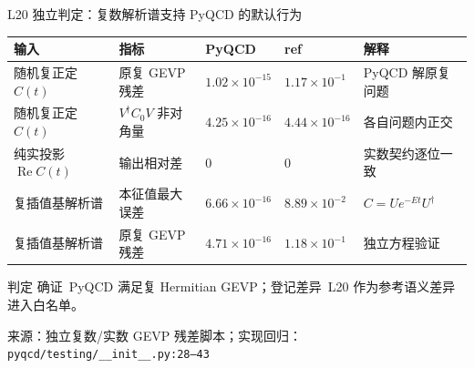 \documentclass[UTF8,aspectratio=169,11pt]{ctexbeamer}
\newcommand{\source}[1]{\vspace{0.05em}\par{\raggedright\scriptsize\color{muted}来源：#1\par}}
\newcommand{\verified}{\textcolor{evidence}{确证}}
\newcommand{\diffmark}{\textcolor{warning}{登记差异}}
\begin{document}
\begin{frame}[t]{L20 独立判定：复数解析谱支持 PyQCD 的默认行为}
  \footnotesize
  \setlength{\tabcolsep}{2pt}
  \renewcommand{\arraystretch}{0.90}
  \begin{tabularx}{0.96\textwidth}{@{}
    >{\raggedright\arraybackslash}p{}
    >{\raggedright\arraybackslash}p{}
    >{\raggedright\arraybackslash}p{}
    >{\raggedright\arraybackslash}p{}
    Y@{}}
    \toprule
    输入 & 指标 & PyQCD & ref & 解释\\
    \midrule
    随机复正定 $C(t)$ & 原复 GEVP 残差 & $1.02\times10^{-15}$ & $1.17\times10^{-1}$ & PyQCD 解原复问题\\
    随机复正定 $C(t)$ & $V^\dagger C_0V$ 非对角量 & $4.25\times10^{-16}$ & $4.44\times10^{-16}$ & 各自问题内正交\\
    纯实投影 $\operatorname{Re}C(t)$ & 输出相对差 & $0$ & $0$ & 实数契约逐位一致\\
    复插值基解析谱 & 本征值最大误差 & $6.66\times10^{-16}$ & $8.89\times10^{-2}$ & $C=Ue^{-Et}U^\dagger$\\
    复插值基解析谱 & 原复 GEVP 残差 & $4.71\times10^{-16}$ & $1.18\times10^{-1}$ & 独立方程验证\\
    \bottomrule
  \end{tabularx}
  \begin{block}{判定}
    \verified\ PyQCD 满足复 Hermitian GEVP；\diffmark\ L20 作为参考语义差异进入白名单。
  \end{block}
  \source{独立复数/实数 GEVP 残差脚本；实现回归：\texttt{pyqcd/testing/\_\_init\_\_.py:28--43}}
\end{frame}
\end{document}
